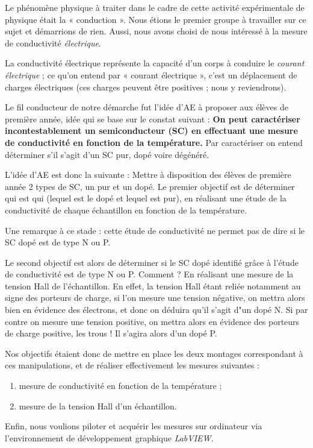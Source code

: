 Le phénomène physique à traiter dans le cadre de cette activité expérimentale de physique était la « conduction ». 
Nous étions le premier groupe à travailler sur ce sujet et démarrions de rien. 
Aussi, nous avons choisi de nous intéressé à la mesure de conductivité \textit{électrique}.

La conductivité électrique représente la capacité d'un corps à conduire le \textit{courant électrique} ; 
ce qu'on entend par « courant électrique », c'est un déplacement de charges électriques 
(ces charges peuvent être positives ; nous y reviendrons).

\bigskip
Le fil conducteur de notre démarche fut l'idée d'AE à proposer aux élèves de première année, 
idée qui se base sur le constat suivant :
\textbf{On peut caractériser incontestablement un semiconducteur (SC) en effectuant 
une mesure de conductivité en fonction de la température.}
Par caractériser on entend déterminer s'il s'agit d'un SC pur, dopé voire dégénéré.

\bigskip
L'idée d'AE est donc la suivante :
Mettre à disposition des élèves de première année 2 types de SC, un pur et un dopé. 
Le premier objectif est de déterminer qui est qui (lequel est le dopé et lequel est pur), 
en réalisant une étude de la conductivité de chaque échantillon 
en fonction de la température.

Une remarque à ce stade : cette étude de conductivité ne permet pas de dire si le SC dopé est de type N ou P.

Le second objectif est alors de déterminer si le SC dopé identifié grâce à l'étude de 
conductivité est de type N ou P.
Comment ? En réalisant une mesure de la tension Hall de l'échantillon.
En effet, la tension Hall étant reliée notamment au signe des porteurs de charge, si l'on mesure une tension négative, 
on mettra alors bien en évidence des électrons, et donc on déduira qu'il s'agit d"un dopé N.
Si par contre on mesure une tension positive, on mettra alors en évidence des porteurs de charge positive, les trous !
Il s'agira alors d'un dopé P.

\bigskip
Nos objectifs étaient donc de mettre en place les deux montages correspondant à ces manipulations, 
et de réaliser effectivement les mesures suivantes :
\begin{enumerate}
\item mesure de conductivité en fonction de la température ;
\item mesure de la tension Hall d'un échantillon.
\end{enumerate}
Enfin, nous voulions piloter et acquérir les mesures sur ordinateur via l'environnement 
de développement graphique \textit{LabVIEW}.
